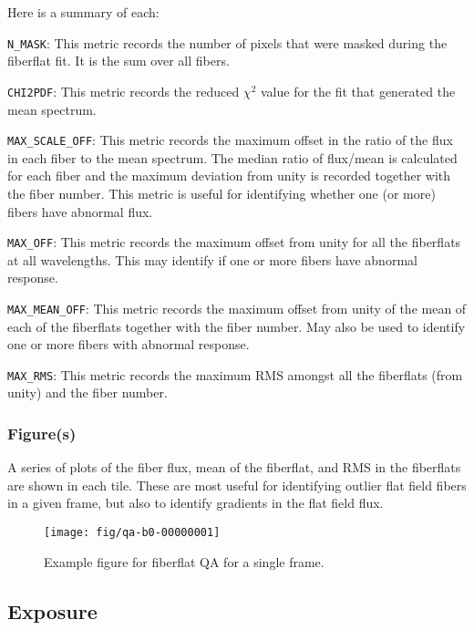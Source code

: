 \documentclass[12pt]{article}
\begin{document}
\noindent
Here is a summary of each:

\vskip 0.2in

\noindent
{\tt N\_MASK}:  This metric records the number of pixels that were
masked during the fiberflat fit.  It is the sum over all fibers.

\noindent
{\tt CHI2PDF}:  This metric records the reduced $\chi^2$ value 
for the fit that generated the mean spectrum.

\noindent
{\tt MAX\_SCALE\_OFF}:  This metric records the maximum offset 
in the ratio of the flux in each fiber to the mean spectrum.
The median ratio of flux/mean
is calculated for each fiber and the maximum
deviation from unity is recorded together with the fiber number.  
This metric is useful for
identifying whether one (or more) fibers have abnormal flux.

\noindent
{\tt MAX\_OFF}:  This metric records the maximum offset from
unity for all the fiberflats at all wavelengths.  
This may identify if one or more fibers have abnormal response.

\noindent
{\tt MAX\_MEAN\_OFF}:  This metric records the maximum offset from
unity of the mean of each of the fiberflats together with the
fiber number.  May also be used
to identify one or more fibers with abnormal response.

\noindent
{\tt MAX\_RMS}:  This metric records the maximum RMS amongst
all the fiberflats (from unity) and the fiber number.

\subsubsection{Figure(s)}

A series of plots of the fiber flux, mean of the fiberflat, and
RMS in the fiberflats are shown in each tile.
These are most useful for identifying outlier flat field
fibers in a given frame, but also to identify gradients 
in the flat field flux.

\begin{figure}[htb]
\begin{center}
\texttt{[image: fig/qa-b0-00000001]}
\caption{Example figure for fiberflat QA
for a single frame.  
}
\label{fig:fiberflat_frame}
\end{center}
\end{figure}


\subsection{Exposure}
\end{document}
